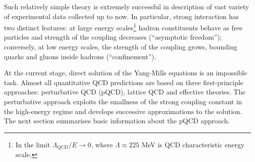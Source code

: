 Such relatively simple theory is extremely successful in description of vast variety of experimental data collected up to now. In particular, strong interaction has two distinct features: at large energy scales\footnote{In the limit $\Lambda_\mathrm{QCD}/E\rightarrow 0$, where $\Lambda\approx 225$ MeV is QCD characteristic energy scale.} hadron constituents behave as free particles and strength of the coupling decreases (``asymptotic freedom''); conversely, at low energy scales, the strength of the coupling grows, bounding quarks and gluons inside hadrons (``confinement'').  
 
At the current stage, direct solution of the Yang-Mills equations is an impossible task. Almost all quantitative QCD predictions are based on three first-principle approaches: perturbative QCD (pQCD), lattice QCD and effective theories. The perturbative approach exploits the smallness of the strong coupling constant in the high-energy regime and develops successive approximations to the solution. The next section summarises basic information about the pQCD approach.

